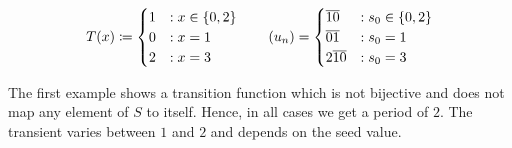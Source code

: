 \documentclass{stdlocal}
\begin{document}
  \hfill
  \begin{minipage}{0.73\textwidth}
    \[
      T(x) \define
      \begin{cases}
        1 &: x \in \set{0,2}{} \\
        0 &: x = 1 \\
        2 &: x = 3
      \end{cases}
      \separate
      (u_n) =
      \begin{cases}
        \overline{10} &: s_0 \in \set{0,2}{} \\
        \overline{01} &: s_0 = 1 \\
        2\overline{10} &: s_0 = 3
      \end{cases}
    \]
  \end{minipage}
  \medskip
  \par
  \noindent
  The first example shows a transition function which is not bijective and does not map any element of $S$ to itself.
  Hence, in all cases we get a period of $2$.
  The transient varies between $1$ and $2$ and depends on the seed value.
\end{document}
